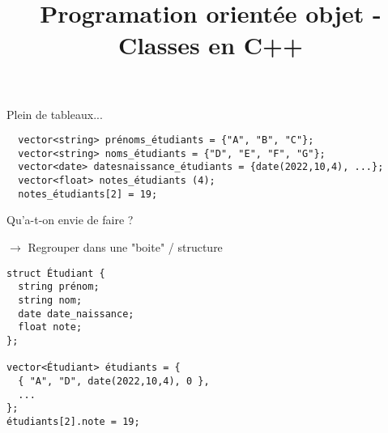 \documentclass[c]{beamer}
\title{Programation orientée objet - Classes en C++}
\begin{document}
\maketitle


\begin{frame}[fragile]{Plein de tableaux...}

\begin{verbatim}
  vector<string> prénoms_étudiants = {"A", "B", "C"};
  vector<string> noms_étudiants = {"D", "E", "F", "G"};
  vector<date> datesnaissance_étudiants = {date(2022,10,4), ...};
  vector<float> notes_étudiants (4);
  notes_étudiants[2] = 19;
\end{verbatim}

\end{frame}

\begin{frame}[fragile]{Qu'a-t-on envie de faire ?}

\pause
$\rightarrow$ Regrouper dans une "boite" / structure
\begin{verbatim}
struct Étudiant {
  string prénom;
  string nom;
  date date_naissance;
  float note;
};

vector<Étudiant> étudiants = {
  { "A", "D", date(2022,10,4), 0 },
  ...
};
étudiants[2].note = 19;
\end{verbatim}

\end{frame}

\end{document}

